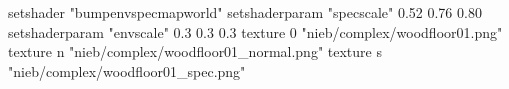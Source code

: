 setshader "bumpenvspecmapworld"
setshaderparam "specscale" 0.52 0.76 0.80
setshaderparam "envscale"  0.3 0.3 0.3
   texture 0 "nieb/complex/woodfloor01.png"
   texture n "nieb/complex/woodfloor01_normal.png"
   texture s "nieb/complex/woodfloor01_spec.png"